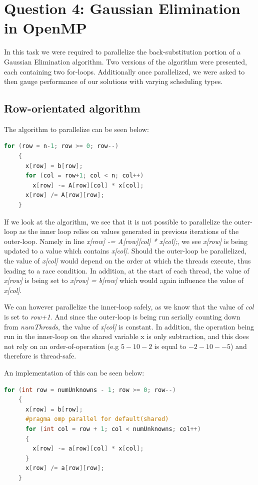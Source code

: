\section{Question 4: Gaussian Elimination in OpenMP}

In this task we were required to parallelize the back-substitution portion of a Gaussian Elimination algorithm. 
Two versions of the algorithm were presented, each containing two for-loops. 
Additionally once parallelized, we were asked to then gauge performance of our solutions with varying scheduling types. 

  \subsection{Row-orientated algorithm}
  The algorithm to parallelize can be seen below:
  \begin{lstlisting}[language=C++]
    for (row = n-1; row >= 0; row--) 
    {
      x[row] = b[row];
      for (col = row+1; col < n; col++)
        x[row] -= A[row][col] * x[col];
      x[row] /= A[row][row];
    }
  \end{lstlisting}

  If we look at the algorithm, we see that it is not possible to parallelize the outer-loop as the inner loop relies on values generated in 
  previous iterations of the outer-loop. 
  Namely in line \textit{x[row] -= A[row][col] * x[col];}, we see \textit{x[row]} is being updated to a value which contains \textit{x[col]}. 
  Should the outer-loop be parallelized, the value of \textit{x[col]} would depend on the order at which the threads execute, thus leading to a race condition. 
  In addition, at the start of each thread, the value of \textit{x[row]} is being set to \textit{x[row] = b[row]} which would again influence the value of \textit{x[col]}.
  
  
  We can however parallelize the inner-loop safely, as we know that the value of \textit{col} is set to \textit{row+1}. And since the outer-loop is being run 
  serially counting down from \textit{numThreads}, the value of \textit{x[col]} is constant. In addition, the operation being run in the inner-loop on the shared variable x
  is only subtraction, and this does not rely on an order-of-operation (e.g $5-10-2$ is equal to $-2-10--5$) and therefore is thread-safe. 
  
  An implementation of this can be seen below:
  \begin{lstlisting}[language=C++]
    for (int row = numUnknowns - 1; row >= 0; row--)
    {
      x[row] = b[row];
      #pragma omp parallel for default(shared)
      for (int col = row + 1; col < numUnknowns; col++)
      {
        x[row] -= a[row][col] * x[col];
      }
      x[row] /= a[row][row];
    }
  \end{lstlisting}
  
